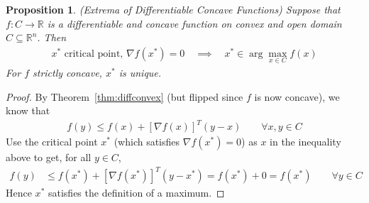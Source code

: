 \documentclass[12pt]{book}
\numberwithin{equation}{section} %
\theoremstyle{plain}
\newtheorem{prop}[thm]{Proposition}
\theoremstyle{definition}
\theoremstyle{remark}
\newcommand{\R}{\mathbb{R}}
\newcommand{\Rn}{\mathbb{R}^n}
\begin{document}
\begin{prop}{\emph{(Extrema of Differentiable Concave Functions)}}
Suppose that $f:C\rightarrow\R$ is a differentiable and concave function
on convex and open domain $C\subseteq\Rn$. Then
\begin{align*}
  \text{$x^*$ critical point, $\nabla f(x^*)=0$}
  \quad\implies\quad
  x^* \in \arg\max_{x\in C} f(x)
\end{align*}
For $f$ \emph{strictly} concave, $x^*$ is \emph{unique}.
\end{prop}
\begin{proof}
By Theorem~\ref{thm:diffconvex} (but flipped since $f$ is now concave),
we know that
\begin{align*}
  f(y) \leq f(x) + [\nabla f(x)]^T (y-x)
  \qquad \forall x,y\in C
\end{align*}
Use the critical point $x^*$ (which satisfies $\nabla f(x^*)=0$) as $x$
in the inequality above to get, for all $y\in C$,
\begin{align*}
  f(y) &\leq f(x^*) + [\nabla f(x^*)]^T (y-x^*)
  = f(x^*) + 0
  = f(x^*)
  \qquad\forall y\in C
\end{align*}
Hence $x^*$ satisfies the definition of a maximum.
\end{proof}
\end{document}
